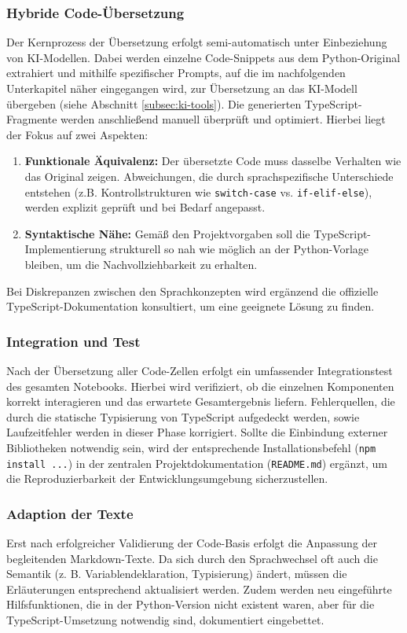 \subsubsection{Hybride Code-Übersetzung}
Der Kernprozess der Übersetzung erfolgt semi-automatisch unter Einbeziehung von \ac{KI}-Modellen. Dabei werden einzelne Code-Snippets aus dem Python-Original extrahiert und mithilfe spezifischer Prompts, auf die im nachfolgenden Unterkapitel näher eingegangen wird, zur Übersetzung an das KI-Modell übergeben (siehe Abschnitt \ref{subsec:ki-tools}).
Die generierten TypeScript-Fragmente werden anschließend manuell überprüft und optimiert. Hierbei liegt der Fokus auf zwei Aspekten:
\begin{enumerate}
	\item \textbf{Funktionale Äquivalenz:} Der übersetzte Code muss dasselbe Verhalten wie das Original zeigen. Abweichungen, die durch sprachspezifische Unterschiede entstehen (z.B. Kontrollstrukturen wie \texttt{switch-case} vs. \texttt{if-elif-else}), werden explizit geprüft und bei Bedarf angepasst.
	\item \textbf{Syntaktische Nähe:} Gemäß den Projektvorgaben soll die TypeScript-Implementierung strukturell so nah wie möglich an der Python-Vorlage bleiben, um die Nachvollziehbarkeit zu erhalten.
\end{enumerate}
Bei Diskrepanzen zwischen den Sprachkonzepten wird ergänzend die offizielle TypeScript-Dokumentation \cite{typescript-documentation} konsultiert, um eine geeignete Lösung zu finden.

\subsubsection{Integration und Test}
Nach der Übersetzung aller Code-Zellen erfolgt ein umfassender Integrationstest des gesamten Notebooks. Hierbei wird verifiziert, ob die einzelnen Komponenten korrekt interagieren und das erwartete Gesamtergebnis liefern. Fehlerquellen, die durch die statische Typisierung von TypeScript aufgedeckt werden, sowie Laufzeitfehler werden in dieser Phase korrigiert. Sollte die Einbindung externer Bibliotheken notwendig sein, wird der entsprechende Installationsbefehl (\texttt{npm install ...}) in der zentralen Projektdokumentation (\texttt{README.md}) ergänzt, um die Reproduzierbarkeit der Entwicklungsumgebung sicherzustellen.

\subsubsection{Adaption der Texte}
Erst nach erfolgreicher Validierung der Code-Basis erfolgt die Anpassung der begleitenden Markdown-Texte. Da sich durch den Sprachwechsel oft auch die Semantik (z. B. Variablendeklaration, Typisierung) ändert, müssen die Erläuterungen entsprechend aktualisiert werden. Zudem werden neu eingeführte Hilfsfunktionen, die in der Python-Version nicht existent waren, aber für die TypeScript-Umsetzung notwendig sind, dokumentiert eingebettet.

